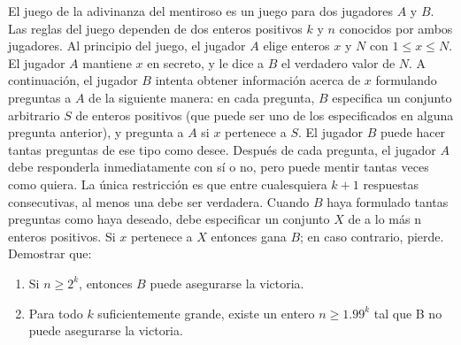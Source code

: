 El juego de la adivinanza del mentiroso es un juego para dos jugadores $A$ y $B$. Las reglas del juego dependen de dos enteros positivos $k$ y $n$ conocidos por ambos jugadores. \newline 
Al principio del juego, el jugador $A$ elige enteros $x$ y $N$ con $1 \leq x \leq N$. El jugador $A$ mantiene $x$ en secreto, y le dice a $B$ el verdadero valor de $N$. A continuación, el jugador $B$ intenta obtener información acerca de $x$ formulando preguntas a $A$ de la siguiente manera: en cada pregunta, $B$ especifica un conjunto arbitrario $S$ de enteros positivos (que puede ser uno de los especificados en alguna pregunta anterior), y pregunta a $A$ si $x$ pertenece a $S$. El jugador $B$ puede hacer tantas preguntas de ese tipo como desee. Después de cada pregunta, el jugador $A$ debe responderla inmediatamente con sí o no, pero puede mentir tantas veces como quiera. La única restricción es que entre cualesquiera $k + 1$ respuestas consecutivas, al menos una debe ser verdadera. \newline 
Cuando $B$ haya formulado tantas preguntas como haya deseado, debe especificar un conjunto $X$ de a lo más n enteros positivos. Si $x$ pertenece a $X$ entonces gana $B$; en caso contrario, pierde. Demostrar que: 
\begin{enumerate}
	\item Si $n \geq 2^k$, entonces $B$ puede asegurarse la victoria.
	\item Para todo $k$ suficientemente grande, existe un entero $n \geq 1.99^k$ tal que B no puede asegurarse la victoria.
\end{enumerate}